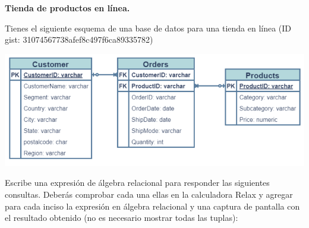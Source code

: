 \begin{center}
    \textbf{\textbf{Tienda de productos en línea.}}

    Tienes el siguiente esquema de una base de datos para una tienda en línea (ID gist: 31074567738afef8c497f6ca89335782)

    \includegraphics[height=5cm]{resources/2.png}

    Escribe una expresión de álgebra relacional para responder las siguientes consultas. Deberás comprobar cada una ellas
en la calculadora Relax y agregar para cada inciso la expresión en álgebra relacional y una captura de pantalla con el
resultado obtenido (no es necesario mostrar todas las tuplas):
\end{center}
